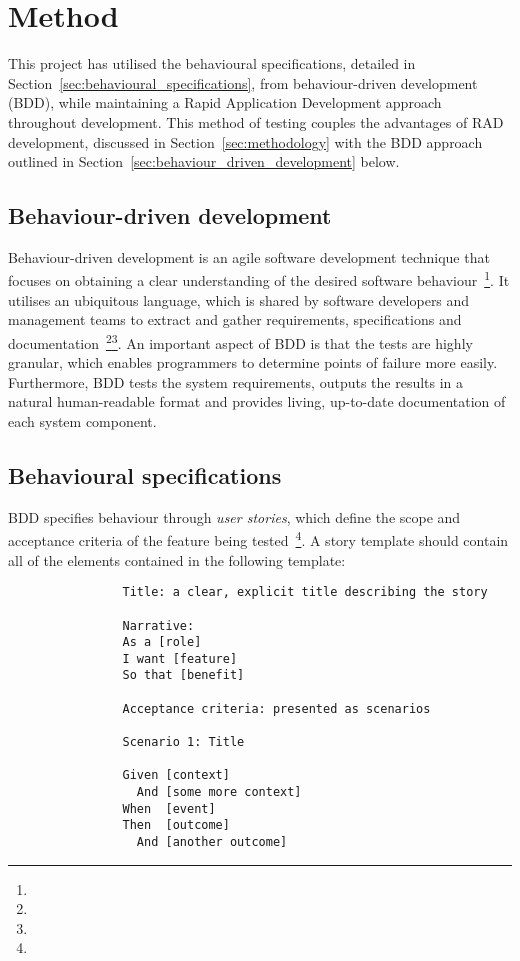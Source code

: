 \section{Method} {
\label{sec:testing_method}

	This project has utilised the behavioural specifications, detailed in Section~\ref{sec:behavioural_specifications}, from behaviour-driven development (BDD), while maintaining a Rapid Application Development approach throughout development. This method of testing couples the advantages of RAD development, discussed in Section~\ref{sec:methodology} with the BDD approach outlined in Section~\ref{sec:behaviour_driven_development} below.

	\subsection{Behaviour-driven development} {
	\label{sec:behaviour_driven_development}

		Behaviour-driven development is an agile software development technique that focuses on obtaining a clear understanding of the desired software behaviour~\footnote{}. It utilises an ubiquitous language, which is shared by software developers and management teams to extract and gather requirements, specifications and documentation~\footnote{}\footnote{}. An important aspect of BDD is that the tests are highly granular, which enables programmers to determine points of failure more easily. Furthermore, BDD tests the system requirements, outputs the results in a natural human-readable format and provides living, up-to-date documentation of each system component.

	}

	\subsection{Behavioural specifications} {
	\label{sec:behavioural_specifications}

		BDD specifies behaviour through \emph{user stories}, which define the scope and acceptance criteria of the feature being tested~\footnote{}. A story template should contain all of the elements contained in the following template:

		\begin{footnotesize}
			\begin{verbatim}
				Title: a clear, explicit title describing the story
	 
				Narrative:
				As a [role]
				I want [feature]
				So that [benefit]
				 
				Acceptance criteria: presented as scenarios
				 
				Scenario 1: Title

				Given [context]
				  And [some more context]
				When  [event]
				Then  [outcome]
				  And [another outcome]
			\end{verbatim}
		\end{footnotesize}

	}

}


